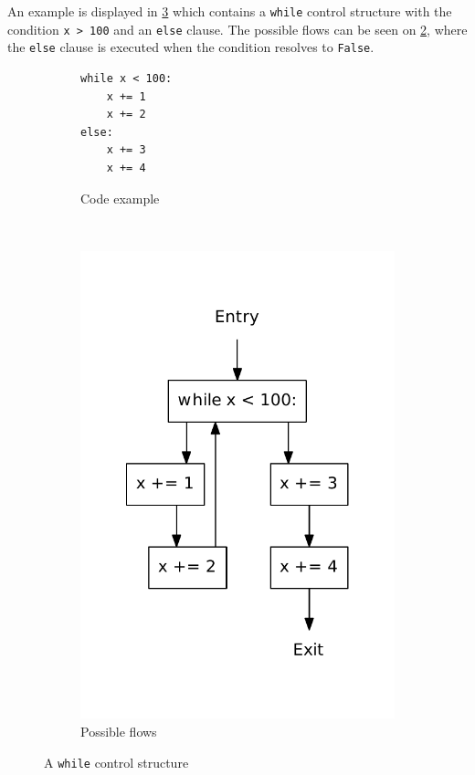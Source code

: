 An example is displayed in \cref{python:while:else} which contains a  \texttt{while} control structure with the condition \texttt{x > 100} and an \texttt{else} clause.
The possible flows can be seen on \cref{python:while:else:flow}, where the \texttt{else} clause is executed when the condition resolves to \texttt{False}.

\begin{figure}[H]
  \centering
  \begin{subfigure}[b]{0.4\textwidth}
    \begin{lstlisting}[style=python]
while x < 100:
    x += 1
    x += 2
else:
    x += 3
    x += 4
    \end{lstlisting}
    \caption{Code example}\label{python:while:else:code}
  \end{subfigure}
  ~ %
  \begin{subfigure}[b]{0.4\textwidth}
    \centering
    \includegraphics[scale=.5]{./figures/while_else.pdf}
    \caption{Possible flows}
    \label{python:while:else:flow}
  \end{subfigure}
  \caption{A \texttt{while} control structure}
  \label{python:while:else}
\end{figure}


